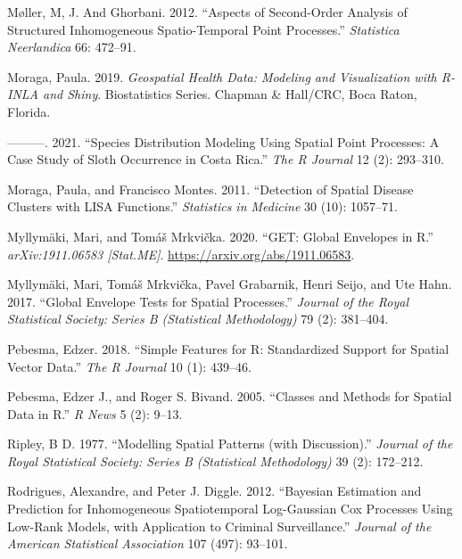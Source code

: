 \begin{CSLReferences}{1}{0}
\leavevmode{}%
Møller, M, J. And Ghorbani. 2012. {``Aspects of Second-Order Analysis of Structured Inhomogeneous Spatio-Temporal Point Processes.''} \emph{Statistica Neerlandica} 66: 472--91.

\leavevmode{}%
Moraga, Paula. 2019. \emph{Geospatial Health Data: Modeling and Visualization with {R-INLA} and Shiny}. Biostatistics Series. Chapman \& Hall/CRC, Boca Raton, Florida.

\leavevmode{}%
---------. 2021. {``Species Distribution Modeling Using Spatial Point Processes: A Case Study of Sloth Occurrence in {C}osta {R}ica.''} \emph{The {R} Journal} 12 (2): 293--310.

\leavevmode{}%
Moraga, Paula, and Francisco Montes. 2011. {``Detection of Spatial Disease Clusters with LISA Functions.''} \emph{Statistics in Medicine} 30 (10): 1057--71.

\leavevmode{}%
Myllymäki, Mari, and Tomáš Mrkvička. 2020. {``{GET}: Global Envelopes in {R}.''} \emph{arXiv:1911.06583 {[}Stat.ME{]}}. \url{https://arxiv.org/abs/1911.06583}.

\leavevmode{}%
Myllymäki, Mari, Tomáš Mrkvička, Pavel Grabarnik, Henri Seijo, and Ute Hahn. 2017. {``Global Envelope Tests for Spatial Processes.''} \emph{Journal of the Royal Statistical Society: Series B (Statistical Methodology)} 79 (2): 381--404.

\leavevmode{}%
Pebesma, Edzer. 2018. {``Simple Features for {R}: Standardized Support for Spatial Vector Data.''} \emph{The {R} Journal} 10 (1): 439--46.

\leavevmode{}%
Pebesma, Edzer J., and Roger S. Bivand. 2005. {``Classes and Methods for Spatial Data in {R}.''} \emph{R News} 5 (2): 9--13.

\leavevmode{}%
Ripley, B D. 1977. {``Modelling Spatial Patterns (with Discussion).''} \emph{Journal of the Royal Statistical Society: Series B (Statistical Methodology)} 39 (2): 172--212.

\leavevmode{}%
Rodrigues, Alexandre, and Peter J. Diggle. 2012. {``Bayesian Estimation and Prediction for Inhomogeneous Spatiotemporal Log-{G}aussian {C}ox Processes Using Low-Rank Models, with Application to Criminal Surveillance.''} \emph{Journal of the American Statistical Association} 107 (497): 93--101.


\end{CSLReferences}
